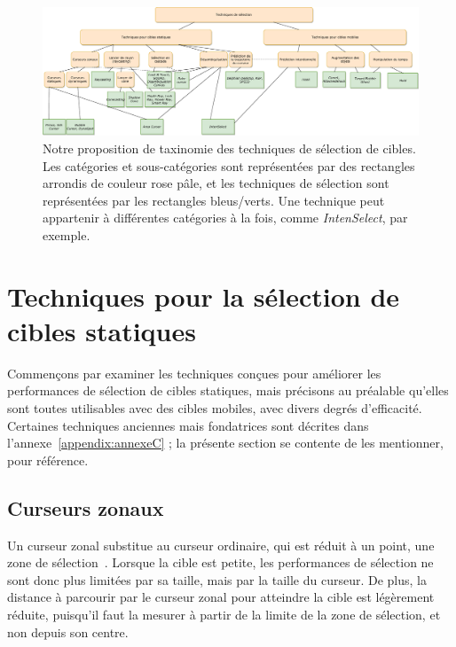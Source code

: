 \begin{landscape}
	\begin{figure}
		\centering
		\includegraphics[width=\linewidth]{figures/ch2/selTechTree}
		\caption[Taxinomie des techniques de sélection de cibles]{Notre proposition de taxinomie des techniques de sélection de cibles. Les catégories et sous-catégories sont représentées par des rectangles arrondis de couleur rose pâle, et les techniques de sélection sont représentées par les rectangles bleus/verts. Une technique peut appartenir à différentes catégories à la fois, comme \emph{IntenSelect}, par exemple.}
		\label{fig:selTaxi}
	\end{figure}
\end{landscape}
	
\section{Techniques pour la sélection de cibles statiques}
	Commençons par examiner les techniques conçues pour améliorer les performances de sélection de cibles statiques, mais précisons au préalable qu'elles sont toutes utilisables avec des cibles mobiles, avec divers degrés d'efficacité. Certaines techniques anciennes mais fondatrices sont décrites dans l'annexe~\ref{appendix:annexeC} ; la présente section se contente de les mentionner, pour référence.

\subsection{Curseurs zonaux}
	Un curseur zonal substitue au curseur ordinaire, qui est réduit à un point, une zone de sélection~\cite{kabbash1995prince, worden1997making}. Lorsque la cible est petite, les performances de sélection ne sont donc plus limitées par sa taille, mais par la taille du curseur. De plus, la distance à parcourir par le curseur zonal pour atteindre la cible est légèrement réduite, puisqu'il faut la mesurer à partir de la limite de la zone de sélection, et non depuis son centre.
	
